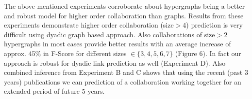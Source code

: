 \documentclass{sig-alternate}
\begin{document}
The above mentioned experiments corroborate about hypergraphs being a better and robust model for higher order collaboration than graphs. Results from these experiments demonstrate higher order collaboration (size$>$4) prediction is very difficult using dyadic graph based approach. Also collaborations of size$>2$ hypergraphs in most cases provide better results with an average increase of approx. 45\% in F-Score for different sizes $\in \{3,4,5,6,7\}$ (Figure 6). In fact our approach is robust for dyadic link prediction as well (Experiment D). Also combined inference from Experiment B and C shows that using the recent (past 3 years) publications we can prediction of a collaboration working together for an extended period of future 5 years. 



%
\end{document}
